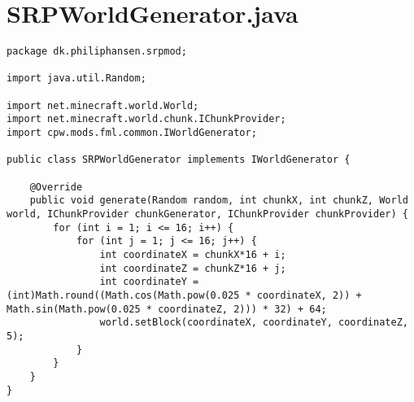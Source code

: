 \documentclass[a4paper,12pt]{report}
\begin{document}
		\chapter{SRPWorldGenerator.java}
		\label{appendixN}
\begin{lstlisting}[label=SRPWorldGenerator.java,caption=SRPWorldGenerator.java]
package dk.philiphansen.srpmod;

import java.util.Random;

import net.minecraft.world.World;
import net.minecraft.world.chunk.IChunkProvider;
import cpw.mods.fml.common.IWorldGenerator;

public class SRPWorldGenerator implements IWorldGenerator {

    @Override
    public void generate(Random random, int chunkX, int chunkZ, World world, IChunkProvider chunkGenerator, IChunkProvider chunkProvider) {
        for (int i = 1; i <= 16; i++) {
            for (int j = 1; j <= 16; j++) {
                int coordinateX = chunkX*16 + i;
                int coordinateZ = chunkZ*16 + j;
                int coordinateY = (int)Math.round((Math.cos(Math.pow(0.025 * coordinateX, 2)) + Math.sin(Math.pow(0.025 * coordinateZ, 2))) * 32) + 64;
                world.setBlock(coordinateX, coordinateY, coordinateZ, 5);			
            }
        }
    }
}
\end{lstlisting}
\end{document}
